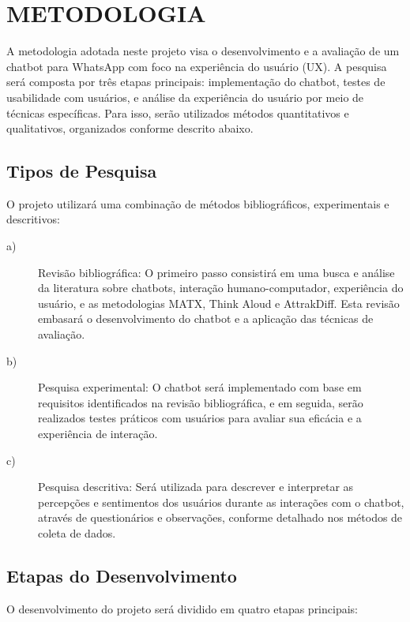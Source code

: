 \chapter{METODOLOGIA}\label{sec:metodologia}
A metodologia adotada neste projeto visa o desenvolvimento e a avaliação de um chatbot para WhatsApp com foco na experiência do usuário (UX). A pesquisa será composta por três etapas principais: implementação do chatbot, testes de usabilidade com usuários, e análise da experiência do usuário por meio de técnicas específicas. Para isso, serão utilizados métodos quantitativos e qualitativos, organizados conforme descrito abaixo.

\section{Tipos de Pesquisa}
O projeto utilizará uma combinação de métodos bibliográficos, experimentais e descritivos:
\begin{description}
    \item[a)] Revisão bibliográfica: O primeiro passo consistirá em uma busca e análise da literatura sobre chatbots, interação humano-computador, experiência do usuário, e as metodologias MATX, Think Aloud e AttrakDiff. Esta revisão embasará o desenvolvimento do chatbot e a aplicação das técnicas de avaliação.
    \item[b)] Pesquisa experimental: O chatbot será implementado com base em requisitos identificados na revisão bibliográfica, e em seguida, serão realizados testes práticos com usuários para avaliar sua eficácia e a experiência de interação.
    \item[c)] Pesquisa descritiva: Será utilizada para descrever e interpretar as percepções e sentimentos dos usuários durante as interações com o chatbot, através de questionários e observações, conforme detalhado nos métodos de coleta de dados.
\end{description}

\section{Etapas do Desenvolvimento}
O desenvolvimento do projeto será dividido em quatro etapas principais:

